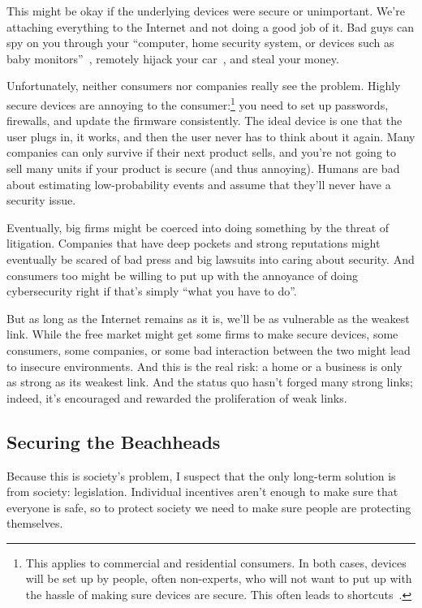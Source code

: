 This might be okay if the underlying devices were secure or
unimportant.
%
We're attaching everything to the Internet and not doing
a good job of it.
%
Bad guys can spy on you through your ``computer, home security system,
or devices such as baby monitors''~\citep{andrews-15}, remotely hijack
your car~\citep{miller-15}, and steal your money.

Unfortunately, neither consumers nor companies really see the problem.
Highly secure devices are annoying to the consumer:\footnote{This
  applies to commercial and residential consumers.  In both cases,
  devices will be set up by people, often non-experts, who will not
  want to put up with the hassle of making sure devices are secure.
  This often leads to shortcuts~\citep{}.}  you need to set up
passwords, firewalls, and update the firmware consistently.  The ideal
device is one that the user plugs in, it works, and then the user
never has to think about it again.
%
Many companies can only survive if
their next product sells, and you're not going to sell many units if
your product is secure (and thus annoying).
%
Humans are bad about
estimating low-probability events and assume that they'll never have a
security issue.


Eventually, big firms might be coerced into doing something by the
threat of litigation.  Companies that have deep pockets and strong
reputations might eventually be scared of bad press and big lawsuits
into caring about security.  And consumers too might be willing to put
up with the annoyance of doing cybersecurity right if that's simply
``what you have to do''.

But as long as the Internet remains as it is, we'll be as vulnerable
as the weakest link.  While the free market might get some firms to
make secure devices, some consumers, some companies, or some bad
interaction between the two might lead to insecure environments.  And
this is the real risk: a home or a business is only as strong as its
weakest link.  And the status quo hasn't forged many strong links;
indeed, it's encouraged and rewarded the proliferation of weak links.

\subsection{Securing the Beachheads}

Because this is society's problem, I suspect that the only long-term
solution is from society: legislation.  Individual incentives aren't
enough to make sure that everyone is safe, so to protect society we
need to make sure people are protecting themselves.

